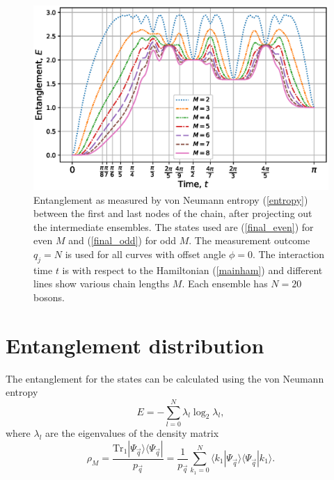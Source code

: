 \documentclass[%
  prx,%
  twocolumn,%
  preprintnumbers,%
  amsmath,%
  amssymb,%
  superscriptaddress%
]{revtex4}
\begin{document}

\begin{figure}
    \centering
    \includegraphics[width=\columnwidth]{entanglement}
    \caption{Entanglement as measured by von Neumann entropy (\ref{entropy})  between the first and last nodes of the chain, after projecting out the intermediate ensembles. The states used are (\ref{final_even}) for even $ M $ and (\ref{final_odd}) for odd $ M $.  The measurement outcome $ q_j = N $ is used for all curves with offset angle $ \phi = 0 $.  The interaction time $ t $ is with respect to the Hamiltonian (\ref{mainham}) and different lines show various chain lengths $ M $. Each ensemble has $ N = 20 $ bosons. }
    \label{fig:entanglement}
\end{figure}




\section{Entanglement distribution}


The entanglement for the states can be calculated using the von Neumann entropy
%
\begin{equation}
E=-\sum^{N}_{l=0} \lambda_l \log_2 \lambda_l ,
\label{entropy}
\end{equation}
%
where $\lambda_l$ are the eigenvalues of the density matrix
%
\begin{equation}
\rho_M = \frac{\text{Tr}_1  |\Psi_{\vec{q}} \rangle\langle\Psi_{\vec{q}} |}{p_{\vec{q}}} =
\frac{1}{p_{\vec{q}}} \sum^N_{k_1=0} \langle k_1|\Psi_{\vec{q}} \rangle\langle \Psi_{\vec{q}} |k_1\rangle . 
\label{rhom}
\end{equation}
\end{document}
